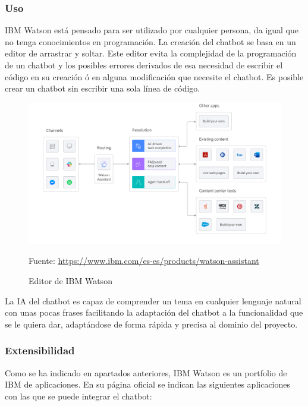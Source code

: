\subsubsection*{Uso}

IBM Watson está pensado para ser utilizado por cualquier persona, da igual que no tenga conocimientos en programación. La creación del chatbot se basa en un editor de arrastrar y soltar. Este editor evita la complejidad de la programación de un chatbot y los posibles errores derivados de esa necesidad de escribir el código en su creación ó en alguna modificación que necesite el chatbot. Es posible crear un chatbot sin escribir una sola línea de código.

\begin{figure}[h]
    \centering
    \includegraphics[width=1.0\textwidth]{imagenes/04_Analisis/editor_IBM_Watson.png}
    \begin{center}
        Fuente: \url{https://www.ibm.com/es-es/products/watson-assistant}
    \end{center}
    \caption{Editor de IBM Watson}
\end{figure}

La IA del chatbot es capaz de comprender un tema en cualquier lenguaje natural con unas pocas frases facilitando la adaptación del chatbot a la funcionalidad que se le quiera dar, adaptándose de forma rápida y precisa al dominio del proyecto.

\subsubsection*{Extensibilidad}

Como se ha indicado en apartados anteriores, IBM Watson es un portfolio de IBM de aplicaciones. En su página oficial \cite{RefWorks:RefID:19-2021productos} se indican las siguientes aplicaciones con las que se puede integrar el chatbot:

